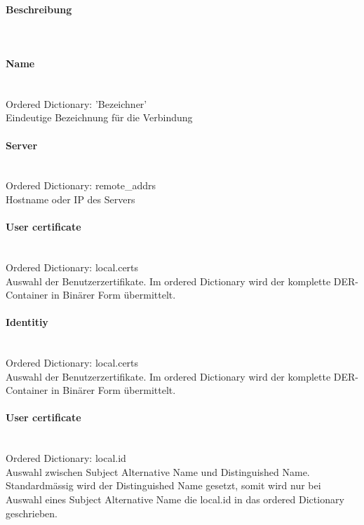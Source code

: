 \hfill
\begin{minipage}[t]{0.5\textwidth}
\vspace{0pt}
\paragraph{Beschreibung}\mbox{}\\
\paragraph{Name}\mbox{}\\
\hspace*{18pt}Ordered Dictionary: 'Bezeichner'\\
Eindeutige Bezeichnung für die Verbindung \\

\paragraph{Server}\mbox{}\\
\hspace*{18pt}Ordered Dictionary: remote\_addrs\\
Hostname oder IP des Servers\\

\paragraph{User certificate}\mbox{}\\
\hspace*{18pt}Ordered Dictionary: local.certs\\
Auswahl der Benutzerzertifikate. Im ordered Dictionary wird der komplette DER-Container in Binärer Form übermittelt.\\

\paragraph{Identitiy}\mbox{}\\
\hspace*{18pt}Ordered Dictionary: local.certs\\
Auswahl der Benutzerzertifikate. Im ordered Dictionary wird der komplette DER-Container in Binärer Form übermittelt.\\

\paragraph{User certificate}\mbox{}\\
\hspace*{18pt}Ordered Dictionary: local.id\\
Auswahl zwischen Subject Alternative Name und Distinguished Name. Standardmässig wird der Distinguished Name gesetzt, somit wird nur bei Auswahl eines Subject Alternative Name die local.id in das ordered Dictionary geschrieben.\\


\end{minipage}
